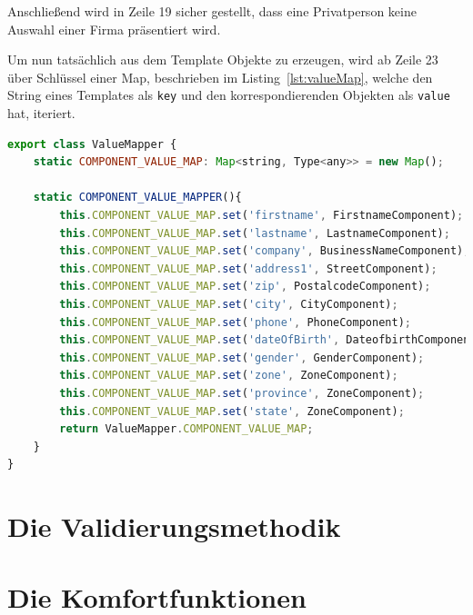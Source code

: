 Anschließend wird in Zeile 19 sicher gestellt, dass eine Privatperson keine Auswahl einer Firma präsentiert wird.

Um nun tatsächlich aus dem Template Objekte zu erzeugen, wird ab Zeile 23 über Schlüssel einer Map, beschrieben im Listing~\ref{lst:valueMap}, welche den String eines Templates als \texttt{key} und den korrespondierenden Objekten als \texttt{value} hat, iteriert. 

\begin{lstlisting}[caption={Vordefiniertes Template für das RF},captionpos=b, language=JavaScript,label={lst:valueMap}]
export class ValueMapper {
	static COMPONENT_VALUE_MAP: Map<string, Type<any>> = new Map();
	
	static COMPONENT_VALUE_MAPPER(){
		this.COMPONENT_VALUE_MAP.set('firstname', FirstnameComponent);
		this.COMPONENT_VALUE_MAP.set('lastname', LastnameComponent);
		this.COMPONENT_VALUE_MAP.set('company', BusinessNameComponent);
		this.COMPONENT_VALUE_MAP.set('address1', StreetComponent);
		this.COMPONENT_VALUE_MAP.set('zip', PostalcodeComponent);
		this.COMPONENT_VALUE_MAP.set('city', CityComponent);
		this.COMPONENT_VALUE_MAP.set('phone', PhoneComponent);
		this.COMPONENT_VALUE_MAP.set('dateOfBirth', DateofbirthComponent);
		this.COMPONENT_VALUE_MAP.set('gender', GenderComponent);
		this.COMPONENT_VALUE_MAP.set('zone', ZoneComponent);
		this.COMPONENT_VALUE_MAP.set('province', ZoneComponent);
		this.COMPONENT_VALUE_MAP.set('state', ZoneComponent);
		return ValueMapper.COMPONENT_VALUE_MAP;
	}
}
\end{lstlisting}


\section{Die Validierungsmethodik}

\section{Die Komfortfunktionen}

